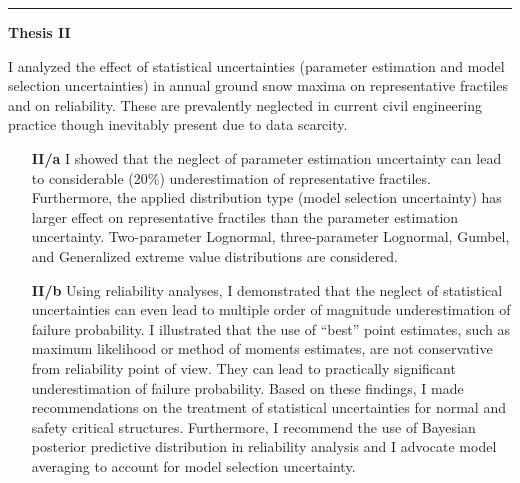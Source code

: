 \begin{center}
	\noindent\rule[0.5ex]{0.5\linewidth}{0.5pt}
	\item[\textbf{Thesis II}] \hfill
\end{center}
I analyzed the effect of statistical uncertainties (parameter estimation and model selection uncertainties) in annual ground snow maxima on representative fractiles and on reliability. These are prevalently neglected in current civil engineering practice though inevitably present due to data scarcity.
\begin{enumerate}[leftmargin=*, align=left, labelwidth=*]
	\item[\textbf{II/a}] I showed that the neglect of parameter estimation uncertainty can lead to considerable (20\%) underestimation of representative fractiles. Furthermore, the applied distribution type (model selection uncertainty) has larger effect on representative fractiles than the parameter estimation uncertainty. Two-parameter Lognormal, three-parameter Lognormal, Gumbel, and Generalized extreme value distributions are considered.
	
	\item[\textbf{II/b}] Using reliability analyses, I demonstrated that the neglect of statistical uncertainties can even lead to multiple order of magnitude underestimation of failure probability. %
	I illustrated that the use of ``best'' point estimates, such as maximum likelihood or method of moments estimates, are not conservative from reliability point of view. They can lead to practically significant underestimation of failure probability. Based on these findings, I made recommendations on the treatment of statistical uncertainties for normal and safety critical structures. Furthermore, I recommend the use of Bayesian posterior predictive distribution in reliability analysis and I advocate model averaging to account for model selection uncertainty.
\end{enumerate}

\citep{RozsasEpistemic2014, RozsasESREL2015, RozsasIABSE2015, RozsasMM2015, RozsasTVSB2015, RozsasIdojaras2016}


